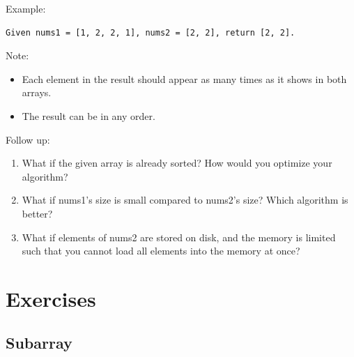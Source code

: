 \documentclass[../specific-algorithms.tex]{subfiles}
\begin{document}
\begin{enumerate}
Example:
\begin{lstlisting}
Given nums1 = [1, 2, 2, 1], nums2 = [2, 2], return [2, 2].
\end{lstlisting}

Note:
\begin{itemize}
    \item Each element in the result should appear as many times as it shows in both arrays.
    \item The result can be in any order.
\end{itemize}

Follow up:
\begin{enumerate}
    \item  What if the given array is already sorted? How would you optimize your algorithm?
    \item What if nums1's size is small compared to nums2's size? Which algorithm is better?
    \item What if elements of nums2 are stored on disk, and the memory is limited such that you cannot load all elements into the memory at once?
\end{enumerate}

\end{enumerate}
\section{Exercises}
\subsection{Subarray}
\end{document}
